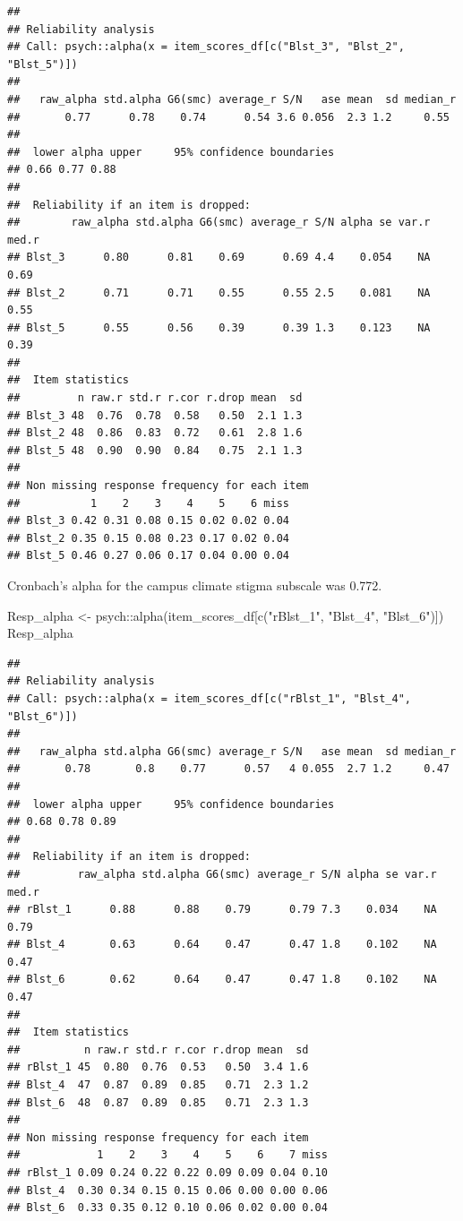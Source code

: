 \documentclass[
  11pt,
]{book}
\newenvironment{Shaded}{\begin{snugshade}}{\end{snugshade}}
\newcommand{\FunctionTok}[1]{\textcolor[rgb]{0.00,0.00,0.00}{#1}}
\newcommand{\NormalTok}[1]{#1}
\newcommand{\OtherTok}[1]{\textcolor[rgb]{0.56,0.35,0.01}{#1}}
\newcommand{\SpecialCharTok}[1]{\textcolor[rgb]{0.00,0.00,0.00}{#1}}
\newcommand{\StringTok}[1]{\textcolor[rgb]{0.31,0.60,0.02}{#1}}
\begin{document}
\begin{verbatim}
## 
## Reliability analysis   
## Call: psych::alpha(x = item_scores_df[c("Blst_3", "Blst_2", "Blst_5")])
## 
##   raw_alpha std.alpha G6(smc) average_r S/N   ase mean  sd median_r
##       0.77      0.78    0.74      0.54 3.6 0.056  2.3 1.2     0.55
## 
##  lower alpha upper     95% confidence boundaries
## 0.66 0.77 0.88 
## 
##  Reliability if an item is dropped:
##        raw_alpha std.alpha G6(smc) average_r S/N alpha se var.r med.r
## Blst_3      0.80      0.81    0.69      0.69 4.4    0.054    NA  0.69
## Blst_2      0.71      0.71    0.55      0.55 2.5    0.081    NA  0.55
## Blst_5      0.55      0.56    0.39      0.39 1.3    0.123    NA  0.39
## 
##  Item statistics 
##         n raw.r std.r r.cor r.drop mean  sd
## Blst_3 48  0.76  0.78  0.58   0.50  2.1 1.3
## Blst_2 48  0.86  0.83  0.72   0.61  2.8 1.6
## Blst_5 48  0.90  0.90  0.84   0.75  2.1 1.3
## 
## Non missing response frequency for each item
##           1    2    3    4    5    6 miss
## Blst_3 0.42 0.31 0.08 0.15 0.02 0.02 0.04
## Blst_2 0.35 0.15 0.08 0.23 0.17 0.02 0.04
## Blst_5 0.46 0.27 0.06 0.17 0.04 0.00 0.04
\end{verbatim}

Cronbach's alpha for the campus climate stigma subscale was 0.772.

\begin{Shaded}
\begin{Highlighting}[]
\NormalTok{Resp\_alpha }\OtherTok{\textless{}{-}}\NormalTok{ psych}\SpecialCharTok{::}\FunctionTok{alpha}\NormalTok{(item\_scores\_df[}\FunctionTok{c}\NormalTok{(}\StringTok{"rBlst\_1"}\NormalTok{, }\StringTok{"Blst\_4"}\NormalTok{, }\StringTok{"Blst\_6"}\NormalTok{)])}
\NormalTok{Resp\_alpha}
\end{Highlighting}
\end{Shaded}

\begin{verbatim}
## 
## Reliability analysis   
## Call: psych::alpha(x = item_scores_df[c("rBlst_1", "Blst_4", "Blst_6")])
## 
##   raw_alpha std.alpha G6(smc) average_r S/N   ase mean  sd median_r
##       0.78       0.8    0.77      0.57   4 0.055  2.7 1.2     0.47
## 
##  lower alpha upper     95% confidence boundaries
## 0.68 0.78 0.89 
## 
##  Reliability if an item is dropped:
##         raw_alpha std.alpha G6(smc) average_r S/N alpha se var.r med.r
## rBlst_1      0.88      0.88    0.79      0.79 7.3    0.034    NA  0.79
## Blst_4       0.63      0.64    0.47      0.47 1.8    0.102    NA  0.47
## Blst_6       0.62      0.64    0.47      0.47 1.8    0.102    NA  0.47
## 
##  Item statistics 
##          n raw.r std.r r.cor r.drop mean  sd
## rBlst_1 45  0.80  0.76  0.53   0.50  3.4 1.6
## Blst_4  47  0.87  0.89  0.85   0.71  2.3 1.2
## Blst_6  48  0.87  0.89  0.85   0.71  2.3 1.3
## 
## Non missing response frequency for each item
##            1    2    3    4    5    6    7 miss
## rBlst_1 0.09 0.24 0.22 0.22 0.09 0.09 0.04 0.10
## Blst_4  0.30 0.34 0.15 0.15 0.06 0.00 0.00 0.06
## Blst_6  0.33 0.35 0.12 0.10 0.06 0.02 0.00 0.04
\end{verbatim}
\end{document}
